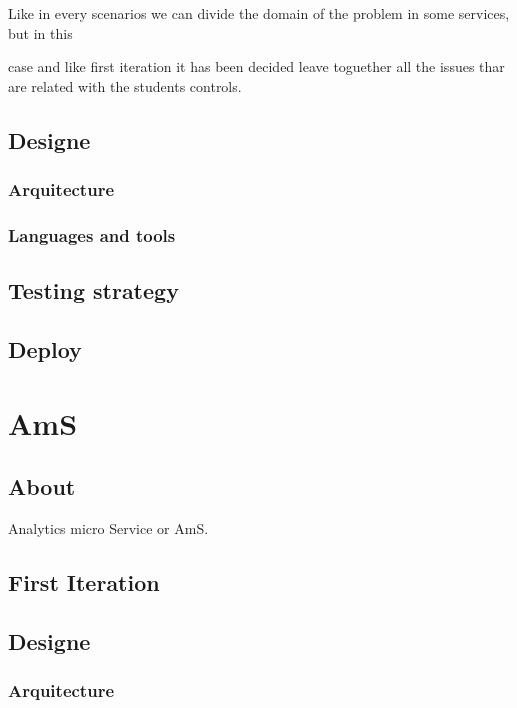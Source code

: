 \documentclass[oneside,english,titlepage]{scrbook}
\begin{document}
Like in every scenarios we can divide the domain of the problem in
some services, but in this

case and like first iteration it has been decided leave toguether
all the issues thar are related with the students controls.

\subsection{Designe}

\subsubsection{Arquitecture}

\subsubsection{Languages and tools}

\subsection{Testing strategy}

\subsection{Deploy}

\section{AmS}

\subsection{About}

Analytics micro Service or AmS.

\subsection{First Iteration}

\subsection{Designe}

\subsubsection{Arquitecture}
\end{document}

